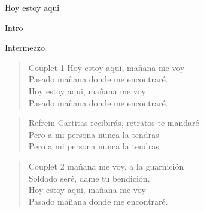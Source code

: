 \begin{song}[huayno]{Hoy estoy aqui}

\begin{instrumental}{Intro}
\measure{}\measure{}\measure{}\measure{}\measure{}
\measure{}\measure{}\measure{}\measure{}\measure{}
\measure{}
\end{instrumental}

\begin{instrumental}{Intermezzo}
\measure{}\measure{}\measure{}\measure{}\measure{}\measure{}\measure{}
\measure{}\measure{}\measure{}\measure{}\measure{}\measure{}\measure{}\measure{}
\measure{}\measure{}
\measure{}\measure{}
\end{instrumental}

\begin{verse}{Couplet 1}
Hoy estoy aqui, ma\~{n}ana me voy\\
Pasado ma\~{n}ana donde me encontraré.\\
Hoy estoy aqui, ma\~{n}ana me voy\\
Pasado ma\~{n}ana donde me encontraré.\phantom{xxxx}\phantom{x}\phantom{xxxx}\phantom{x}
\end{verse}

\begin{verse}{Refrein}
Cartitas recibir\'{a}s, \hspace{5em} retratos te mandaré \\
Pero a mi persona nunca la tendras\\
Pero a mi persona nunca la tendras\phantom{xx}\phantom{x}\phantom{x}
\end{verse}
\begin{verse}{Couplet 2}
ma\~{n}ana me voy, a la guarnici\'{o}n\\
Soldado ser\'{e}, dame tu bendici\'{o}n.\\
Hoy estoy aqui, ma\~{n}ana me voy\\
Pasado ma\~{n}ana donde me encontrar\'{e}.\phantom{xxxx}\phantom{x}\phantom{xxxx}\phantom{x}
\end{verse}


\end{song}
